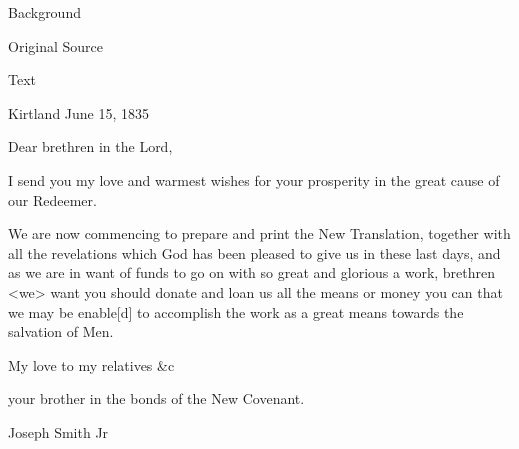 			\begin{description}
				\item[Background]
			\end{description}
			
			
			\begin{description}
				\item[Original Source]
			\end{description}
			
			
			\begin{description}
				\item[Text]
			\end{description}
			
				\begin{tightright}
				Kirtland June 15, 1835
				\end{tightright}

				Dear brethren in the Lord,

				I send you my love and warmest wishes for your prosperity in the great cause of our Redeemer.

				We are now commencing to prepare and print the New Translation, together with all the revelations which God has been pleased to give us in these last days, and as we are in want of funds to go on with so great and glorious a work, brethren <we> want you should donate and loan us all the means or money you can that we may be enable[d] to accomplish the work as a great means towards the salvation of Men.

				My love to my relatives \&c

				\begin{tightright}
				your brother in the bonds of the New Covenant.

				Joseph Smith Jr
				\end{tightright}
				
